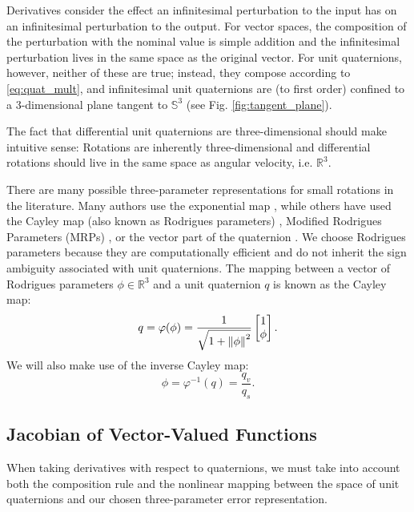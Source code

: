 \documentclass[letterpaper, 10 pt, conference]{ieeeconf}  %
\newcommand{\R}{\mathbb{R}}
\newcommand{\Q}{\mathbb{S}^3}
\begin{document}
        Derivatives consider the effect an infinitesimal perturbation to the input has on
        an infinitesimal perturbation to the output. For vector spaces, the composition
        of the perturbation with the nominal value is simple addition and the
        infinitesimal perturbation lives in the same space as the original vector. For
        unit quaternions, however, neither of these are true; instead, they compose
        according to \eqref{eq:quat_mult}, and infinitesimal unit quaternions are (to
        first order) confined to a 3-dimensional plane tangent to $\Q$ (see Fig.
        \ref{fig:tangent_plane}).

        The fact that differential unit quaternions are three-dimensional should make
        intuitive sense: Rotations are inherently three-dimensional and differential
        rotations should live in the same space as angular velocity, i.e. $\R^3$.
        
        There are many possible three-parameter representations for small rotations in
        the literature. Many authors use the exponential map \cite{Baillieul1978,
        Zefran1998, Lee2008, Saccon2013, Sola2017, Fan2016, watterson2018trajectory},
        while others have used the Cayley map (also known as Rodrigues parameters)
        \cite{Kobilarov2011, Kobilarov2014}, Modified Rodrigues Parameters (MRPs)
        \cite{Terzakis2018}, or the vector part of the quaternion \cite{Fresk2013}.
        We choose Rodrigues parameters \cite{markley2014fundamentals} because they are
        computationally efficient and do not inherit the sign ambiguity associated with
        unit quaternions. The mapping between a vector of Rodrigues parameters $\phi \in
        \R^3$ and a unit quaternion $q$ is known as the Cayley map: \begin{equation}
        \label{eq:cayley}
            q = \varphi(\phi) = \frac{1}{\sqrt{1 + \norm{\phi}^2}} \begin{bmatrix} 1 \\ \phi \end{bmatrix}.
        \end{equation}
        We will also make use of the inverse Cayley map:
        \begin{equation}
            \phi = \varphi^{-1}(q) = \frac{q_v}{q_s}.
        \end{equation}

    \subsection{Jacobian of Vector-Valued Functions}
        When taking derivatives with respect to quaternions, we must take into account
        both the composition rule and the nonlinear mapping between the space of unit
        quaternions and our chosen three-parameter error representation.
\end{document}
